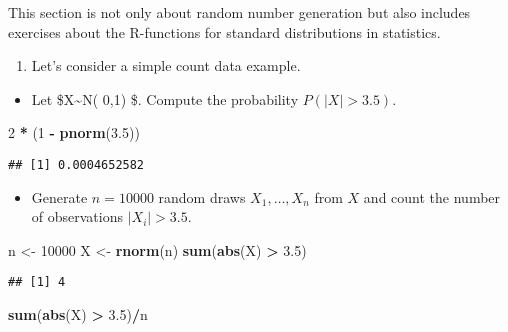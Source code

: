 \documentclass[]{article}
\newenvironment{Shaded}{\begin{snugshade}}{\end{snugshade}}
\newcommand{\KeywordTok}[1]{\textcolor[rgb]{0.13,0.29,0.53}{\textbf{#1}}}
\newcommand{\DecValTok}[1]{\textcolor[rgb]{0.00,0.00,0.81}{#1}}
\newcommand{\FloatTok}[1]{\textcolor[rgb]{0.00,0.00,0.81}{#1}}
\newcommand{\StringTok}[1]{\textcolor[rgb]{0.31,0.60,0.02}{#1}}
\newcommand{\OperatorTok}[1]{\textcolor[rgb]{0.81,0.36,0.00}{\textbf{#1}}}
\newcommand{\NormalTok}[1]{#1}
\providecommand{\tightlist}{%
  \setlength{\itemsep}{0pt}\setlength{\parskip}{0pt}}
\begin{document}
This section is not only about random number generation but also
includes exercises about the R-functions for standard distributions in
statistics.

\begin{enumerate}
\def\labelenumi{\arabic{enumi}.}
\tightlist
\item
  Let's consider a simple count data example.
\end{enumerate}

\begin{itemize}
\tightlist
\item
  Let \$X\sim N\left( 0,1\right) \$. Compute the probability
  \(P(|X|>3.5)\).
\end{itemize}

\begin{Shaded}
\begin{Highlighting}[]
\DecValTok{2} \OperatorTok{*}\StringTok{ }\NormalTok{(}\DecValTok{1} \OperatorTok{-}\StringTok{ }\KeywordTok{pnorm}\NormalTok{(}\FloatTok{3.5}\NormalTok{))}
\end{Highlighting}
\end{Shaded}

\begin{verbatim}
## [1] 0.0004652582
\end{verbatim}

\begin{itemize}
\tightlist
\item
  Generate \(n=10000\) random draws \(X_{1},\ldots ,X_{n}\) from \(X\)
  and count the number of observations \(|X_{i}|>3.5\).
\end{itemize}

\begin{Shaded}
\begin{Highlighting}[]
\NormalTok{n <-}\StringTok{ }\DecValTok{10000}
\NormalTok{X <-}\StringTok{ }\KeywordTok{rnorm}\NormalTok{(n)}
\KeywordTok{sum}\NormalTok{(}\KeywordTok{abs}\NormalTok{(X) }\OperatorTok{>}\StringTok{ }\FloatTok{3.5}\NormalTok{)}
\end{Highlighting}
\end{Shaded}

\begin{verbatim}
## [1] 4
\end{verbatim}

\begin{Shaded}
\begin{Highlighting}[]
\KeywordTok{sum}\NormalTok{(}\KeywordTok{abs}\NormalTok{(X) }\OperatorTok{>}\StringTok{ }\FloatTok{3.5}\NormalTok{)}\OperatorTok{/}\NormalTok{n}
\end{Highlighting}
\end{Shaded}
\end{document}
